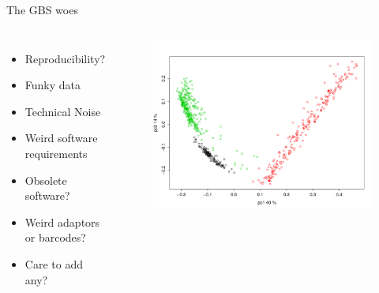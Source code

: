 \documentclass[t]{beamer}
\begin{document}
\begin{frame}{The GBS woes}
  \begin{columns}[t]
      \begin{itemize}
        \item Reproducibility?
        \item Funky data
        \item Technical Noise
        \item Weird software requirements
        \item Obsolete software?
        \item Weird adaptors or barcodes?
        \item Care to add any?
      \end{itemize}
    \begin{figure}[h]
      \centering
      \includegraphics[width=\linewidth]{img/lane-effect.png}
    \end{figure}
  \end{columns}
\end{frame}


\end{document}

